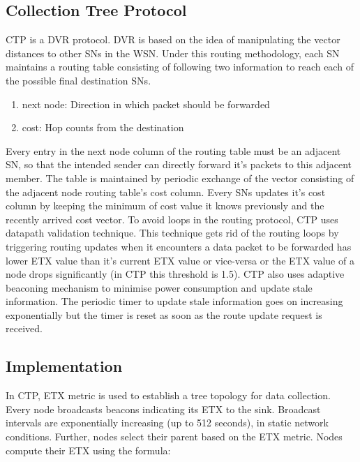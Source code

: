 	
	\subsection{Collection Tree Protocol}
	
	\ac{CTP} is a \ac{DVR} protocol. \ac{DVR} is based on the idea of manipulating the vector distances to other \acp{SN} in the \ac{WSN}. Under this routing methodology, each \ac{SN} maintains a routing table consisting of following two information to reach each of the possible final destination \acp{SN}. 
	
	\begin{enumerate}
	    \item next node: Direction in which packet should be forwarded
	    \item cost: Hop counts from the destination
	\end{enumerate}
	
	Every entry in the next node column of the routing table must be an adjacent \ac{SN}, so that the intended sender can directly forward it's packets to this adjacent member. The table is maintained by periodic exchange of the vector consisting of the adjacent node routing table's cost column. Every \acp{SN} updates it's cost column by keeping the minimum of cost value it knows previously and the recently arrived cost vector. To avoid loops in the routing protocol, \ac{CTP} uses datapath validation technique. This technique gets rid of the routing loops by triggering routing updates when it encounters a data packet to be forwarded has lower \ac{ETX} value than it's current \ac{ETX} value or vice-versa or the \ac{ETX} value of a node drops significantly (in \ac{CTP} this threshold is 1.5). \ac{CTP} also uses adaptive beaconing mechanism to minimise power consumption and update stale information. The periodic timer to update stale information goes on increasing exponentially but the timer is reset as soon as the route update request is received. 
	
	\subsection{Implementation}
	
	In \ac{CTP}, \ac{ETX} metric is used to establish a tree topology for data collection. Every node broadcasts beacons indicating its \ac{ETX} to the sink. Broadcast intervals are exponentially increasing (up to 512 seconds), in static network conditions. Further, nodes select their parent based on the \ac{ETX} metric. Nodes compute their \ac{ETX} using the formula: 

